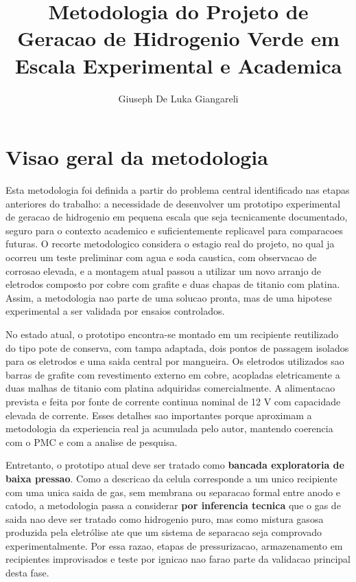 \documentclass[12pt,oneside,a4paper,brazilian]{abntex2}
\title{Metodologia do Projeto de Geracao de Hidrogenio Verde em Escala Experimental e Academica}
\author{Giuseph De Luka Giangareli}
\date{}
\begin{document}
\maketitle

\section{Visao geral da metodologia}

Esta metodologia foi definida a partir do problema central identificado nas etapas anteriores do trabalho: a necessidade de desenvolver um prototipo experimental de geracao de hidrogenio em pequena escala que seja tecnicamente documentado, seguro para o contexto academico e suficientemente replicavel para comparacoes futuras. O recorte metodologico considera o estagio real do projeto, no qual ja ocorreu um teste preliminar com agua e soda caustica, com observacao de corrosao elevada, e a montagem atual passou a utilizar um novo arranjo de eletrodos composto por cobre com grafite e duas chapas de titanio com platina. Assim, a metodologia nao parte de uma solucao pronta, mas de uma hipotese experimental a ser validada por ensaios controlados.

No estado atual, o prototipo encontra-se montado em um recipiente reutilizado do tipo pote de conserva, com tampa adaptada, dois pontos de passagem isolados para os eletrodos e uma saida central por mangueira. Os eletrodos utilizados sao barras de grafite com revestimento externo em cobre, acopladas eletricamente a duas malhas de titanio com platina adquiridas comercialmente. A alimentacao prevista e feita por fonte de corrente continua nominal de 12 V com capacidade elevada de corrente. Esses detalhes sao importantes porque aproximam a metodologia da experiencia real ja acumulada pelo autor, mantendo coerencia com o PMC e com a analise de pesquisa.

Entretanto, o prototipo atual deve ser tratado como \textbf{bancada exploratoria de baixa pressao}. Como a descricao da celula corresponde a um unico recipiente com uma unica saida de gas, sem membrana ou separacao formal entre anodo e catodo, a metodologia passa a considerar \textbf{por inferencia tecnica} que o gas de saida nao deve ser tratado como hidrogenio puro, mas como mistura gasosa produzida pela eletrólise ate que um sistema de separacao seja comprovado experimentalmente. Por essa razao, etapas de pressurizacao, armazenamento em recipientes improvisados e teste por ignicao nao farao parte da validacao principal desta fase.
\end{document}
